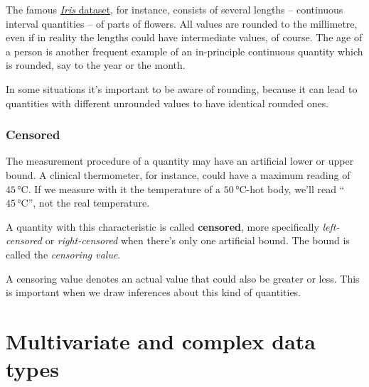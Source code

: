 \documentclass[
  a4paper,
  DIV=11,
  numbers=noendperiod,
  oneside]{scrreprt}
\begin{document}
The famous
\href{https://doi.org/10.1111/j.1469-1809.1936.tb02137.x}{\emph{Iris}
dataset}, for instance, consists of several lengths -- continuous
interval quantities -- of parts of flowers. All values are rounded to
the millimetre, even if in reality the lengths could have intermediate
values, of course. The age of a person is another frequent example of an
in-principle continuous quantity which is rounded, say to the year or
the month.

In some situations it's important to be aware of rounding, because it
can lead to quantities with different unrounded values to have identical
rounded ones.

\hypertarget{censored}{%
\subsection{Censored}\label{censored}}

The measurement procedure of a quantity may have an artificial lower or
upper bound. A clinical thermometer, for instance, could have a maximum
reading of \(45\,\mathrm{°C}\). If we measure with it the temperature of
a \(50\,\mathrm{°C}\)-hot body, we'll read {``\(45\,\mathrm{°C}\)'',}
not the real temperature.

A quantity with this characteristic is called {\textbf{censored}}, more
specifically \emph{left-censored} or \emph{right-censored} when there's
only one artificial bound. The bound is called the \emph{censoring
value}.

A censoring value denotes an actual value that could also be greater or
less. This is important when we draw inferences about this kind of
quantities.

\hypertarget{sec-data-types-multi}{%
\chapter{Multivariate and complex data
types}\label{sec-data-types-multi}}

\providecommand{\ul}{\uline}
\renewcommand*{\|}[1][]{\nonscript\:#1\vert\nonscript\:\mathopen{}}
\providecommand*{\pr}[1]{\textsf{\small`#1'}}
\renewcommand*{\pr}[1]{\textsf{\small`#1'}}
\providecommand*{\prq}[1]{\textsf{\small #1}}

\providecommand{\se}[1]{\mathsfit{#1}}
\renewcommand{\se}[1]{\mathsfit{#1}}
\providecommand{\p}{\mathrm{p}}
\renewcommand{\p}{\mathrm{p}}
\renewcommand{\P}{\mathrm{P}}
\end{document}
